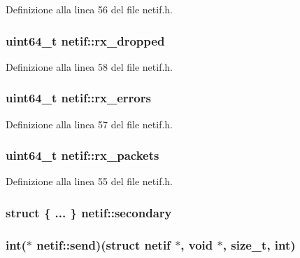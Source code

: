 Definizione alla linea 56 del file netif.\+h.

\hypertarget{structnetif_a1fc7320d2883ee21c7fe0fd954a70887}{
\subsubsection[{rx\+\_\+dropped}]{\setlength{\rightskip}{0pt plus 5cm}uint64\+\_\+t netif\+::rx\+\_\+dropped}}\label{structnetif_a1fc7320d2883ee21c7fe0fd954a70887}


Definizione alla linea 58 del file netif.\+h.

\hypertarget{structnetif_adb3c694759403e67d539a5e81a552c92}{
\subsubsection[{rx\+\_\+errors}]{\setlength{\rightskip}{0pt plus 5cm}uint64\+\_\+t netif\+::rx\+\_\+errors}}\label{structnetif_adb3c694759403e67d539a5e81a552c92}


Definizione alla linea 57 del file netif.\+h.

\hypertarget{structnetif_a80040f58867713ff1b5ec982a450221e}{
\subsubsection[{rx\+\_\+packets}]{\setlength{\rightskip}{0pt plus 5cm}uint64\+\_\+t netif\+::rx\+\_\+packets}}\label{structnetif_a80040f58867713ff1b5ec982a450221e}


Definizione alla linea 55 del file netif.\+h.

\hypertarget{structnetif_a793ad0cb27997bfa7874a2097a77b0e2}{
\subsubsection[{secondary}]{\setlength{\rightskip}{0pt plus 5cm}struct \{ ... \}   netif\+::secondary}}\label{structnetif_a793ad0cb27997bfa7874a2097a77b0e2}
\hypertarget{structnetif_ac0505ae55088f68c2cefa77dc6871208}{
\subsubsection[{send}]{\setlength{\rightskip}{0pt plus 5cm}int($\ast$ netif\+::send)(struct {\bf netif} $\ast$, void $\ast$, size\+\_\+t, int)}}\label{structnetif_ac0505ae55088f68c2cefa77dc6871208}


